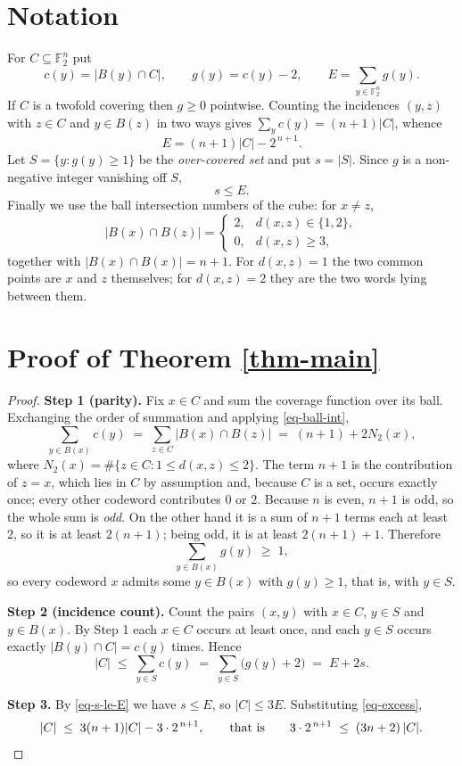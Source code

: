 \documentclass[10pt,a4paper]{article}
\begin{document}
\section{Notation}\label{sec-notation}

For $C\subseteq\mathbb{F}_2^n$ put
\[
  c(y)=|B(y)\cap C|,\qquad g(y)=c(y)-2,\qquad E=\sum_{y\in\mathbb{F}_2^n} g(y).
\]
If $C$ is a twofold covering then $g\ge 0$ pointwise. Counting the incidences
$(y,z)$ with $z\in C$ and $y\in B(z)$ in two ways gives
$\sum_y c(y)=(n+1)|C|$, whence
\begin{equation}\label{eq-excess}
  E=(n+1)|C|-2^{\,n+1}.
\end{equation}
Let $S=\{y: g(y)\ge 1\}$ be the \emph{over-covered set} and put $s=|S|$. Since
$g$ is a non-negative integer vanishing off $S$,
\begin{equation}\label{eq-s-le-E}
  s\le E.
\end{equation}
Finally we use the ball intersection numbers of the cube: for $x\ne z$,
\begin{equation}\label{eq-ball-int}
  |B(x)\cap B(z)| =
  \begin{cases}
    2, & d(x,z)\in\{1,2\},\\
    0, & d(x,z)\ge 3,
  \end{cases}
\end{equation}
together with $|B(x)\cap B(x)|=n+1$. For $d(x,z)=1$ the two common points are
$x$ and $z$ themselves; for $d(x,z)=2$ they are the two words lying between
them.

\section{Proof of Theorem \ref{thm-main}}\label{sec-proof}

\begin{proof}
\textbf{Step 1 (parity).} Fix $x\in C$ and sum the coverage function over its
ball. Exchanging the order of summation and applying \eqref{eq-ball-int},
\[
  \sum_{y\in B(x)} c(y)
  \;=\; \sum_{z\in C} |B(x)\cap B(z)|
  \;=\; (n+1) + 2N_2(x),
\]
where $N_2(x)=\#\{z\in C: 1\le d(x,z)\le 2\}$. The term $n+1$ is the
contribution of $z=x$, which lies in $C$ by assumption and, because $C$ is a
set, occurs exactly once; every other codeword contributes $0$ or $2$. Because
$n$ is even, $n+1$ is odd, so the whole sum is \emph{odd}. On the other hand it
is a sum of $n+1$ terms each at least $2$, so it is at least $2(n+1)$; being
odd, it is at least $2(n+1)+1$. Therefore
\[
  \sum_{y\in B(x)} g(y)\;\ge\;1 ,
\]
so every codeword $x$ admits some $y\in B(x)$ with $g(y)\ge 1$, that is, with
$y\in S$.

\textbf{Step 2 (incidence count).} Count the pairs $(x,y)$ with $x\in C$,
$y\in S$ and $y\in B(x)$. By Step 1 each $x\in C$ occurs at least once, and each
$y\in S$ occurs exactly $|B(y)\cap C|=c(y)$ times. Hence
\[
  |C| \;\le\; \sum_{y\in S} c(y) \;=\; \sum_{y\in S}\bigl(g(y)+2\bigr)
      \;=\; E + 2s .
\]

\textbf{Step 3.} By \eqref{eq-s-le-E} we have $s\le E$, so $|C|\le 3E$.
Substituting \eqref{eq-excess},
\[
  |C| \;\le\; 3(n+1)|C| - 3\cdot 2^{\,n+1},
  \qquad\text{that is}\qquad
  3\cdot 2^{\,n+1} \;\le\; (3n+2)\,|C| . \qedhere
\]
\end{proof}
\end{document}
